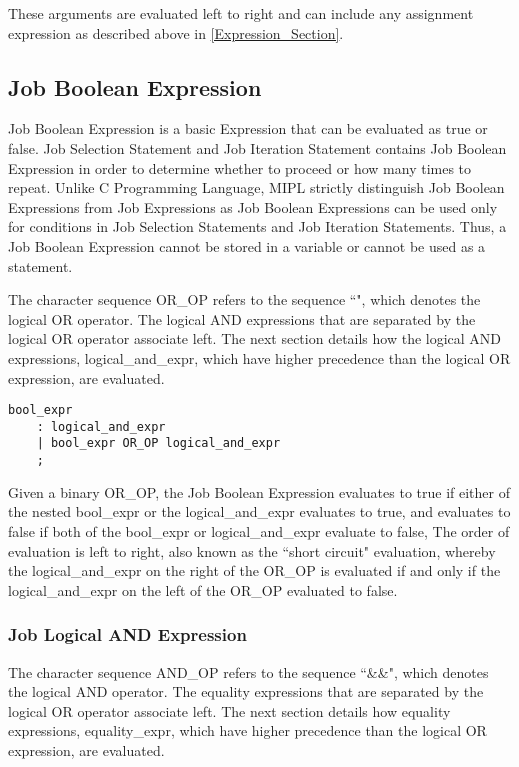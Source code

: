 \documentclass[prodmode,acmtecs]{acmsmall}
\begin{document}
These arguments are evaluated left to right and can include any assignment 
expression as described above in \ref{Expression_Section}.
\medskip

\subsection{Job Boolean Expression}

Job Boolean Expression is a basic Expression that can be evaluated as
true or false.  Job Selection Statement and Job Iteration Statement
contains Job Boolean Expression in order to determine whether to proceed
or how many times to repeat.  Unlike C Programming Language, MIPL strictly
distinguish Job Boolean Expressions from Job Expressions as Job Boolean
Expressions can be used only for conditions in Job Selection Statements
and Job Iteration Statements.  Thus, a Job Boolean Expression cannot be
stored in a variable or cannot be used as a statement.

The character sequence OR\_OP refers to the sequence ``\textbardbl", which  
denotes the logical OR operator. The logical AND expressions that are 
separated by the logical OR operator associate left. The next section 
details how the logical AND expressions, logical\_and\_expr, which have 
higher precedence than the logical OR expression, are evaluated. 

\begin{lstlisting}
bool_expr
	: logical_and_expr
	| bool_expr OR_OP logical_and_expr
	;
\end{lstlisting}

Given a binary OR\_OP, the Job Boolean Expression evaluates to true 
if either of the nested bool\_expr or the logical\_and\_expr evaluates
to true, and evaluates to false if both of the bool\_expr or
logical\_and\_expr evaluate to false, The order of evaluation is left
to right, also known as the ``short circuit" evaluation, whereby
the logical\_and\_expr on the right of the OR\_OP is evaluated if
and only if the logical\_and\_expr on the left of the OR\_OP 
evaluated to false. 
\medskip

\subsubsection{Job Logical AND Expression}

The character sequence AND\_OP refers to the sequence ``\&\&", which 
denotes the logical AND operator. The equality expressions that are 
separated by the logical OR operator associate left. The next section 
details how equality expressions, equality\_expr, which have higher 
precedence than the logical OR expression, are evaluated. 
\end{document}
